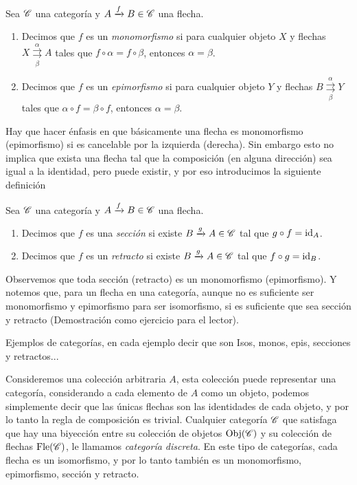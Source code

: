 \documentclass{comunicaciones}
\begin{document}
\begin{dfn}
    Sea $\mathscr C$ una categoría y $A\xrightarrow{f}B\in\mathscr C$ una flecha. 
    \begin{enumerate}
        \item Decimos que $f$ es un \emph{monomorfismo} si para cualquier objeto $X$ y flechas $X\overset{\alpha}{\underset{\beta}{\rightrightarrows}}A$
              tales que $f\circ\alpha=f\circ\beta$, entonces $\alpha=\beta$. 
        \item Decimos que $f$ es un \emph{epimorfismo} si para cualquier objeto $Y$ y flechas $B\overset{\alpha}{\underset{\beta}{\rightrightarrows}}Y$
              tales que $\alpha\circ f=\beta\circ f$, entonces $\alpha=\beta$.
    \end{enumerate}
\end{dfn}
Hay que hacer énfasis en que básicamente una flecha es monomorfismo (epimorfismo) si es cancelable por la izquierda (derecha). Sin embargo esto no implica
que exista una flecha tal que la composición (en alguna dirección) sea igual a la identidad, pero puede existir, y por eso introducimos la siguiente definición
\begin{dfn}
    Sea $\mathscr C$ una categoría y $A\xrightarrow{f}B\in\mathscr C$ una flecha. 
    \begin{enumerate}
        \item Decimos que $f$ es una \emph{sección} si existe $B\xrightarrow{g}A\in\mathscr C$ tal que $g\circ f=\mathrm{id}_A$. 
        \item Decimos que $f$ es un \emph{retracto} si existe $B\xrightarrow{g}A\in\mathscr C$ tal que $f\circ g=\mathrm{id}_B$.
    \end{enumerate}
\end{dfn}

Observemos que toda sección (retracto) es un monomorfismo (epimorfismo). Y notemos que, para un flecha en una categoría, aunque no es suficiente ser monomorfismo
y epimorfismo para ser isomorfismo, si es suficiente que sea sección y retracto (Demostración como ejercicio para el lector).

Ejemplos de categorías, en cada ejemplo decir que son Isos, monos, epis, secciones y retractos...

\begin{ej}\label{categorías discretas}
    Consideremos una colección arbitraria $A$, esta colección puede representar una categoría, considerando a cada elemento de $A$ como un objeto, podemos
    simplemente decir que las únicas flechas son las identidades de cada objeto, y por lo tanto la regla de composición es trivial.
    Cualquier categoría $\mathscr C$ que satisfaga que hay una biyección entre su colección de objetos $\mathrm{Obj}(\mathscr C)$ y su colección de flechas $\mathrm{Fle}(\mathscr C)$, le llamamos
    \emph{categoría discreta}. En este tipo de categorías, cada flecha es un isomorfismo, y por lo tanto también es un monomorfismo, epimorfismo, sección y retracto.
\end{ej}
\end{document}
